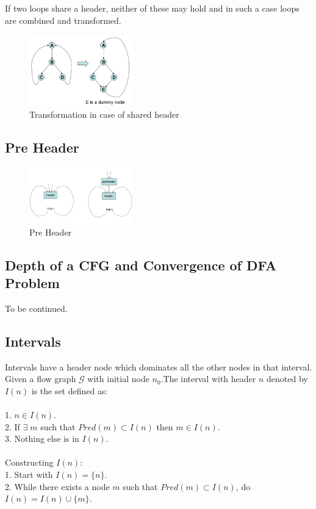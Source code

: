 \documentclass{article}
\begin{document}
If two loops share a header, neither of these may hold and in such a case loops are combined and transformed.

\begin{figure}[h]
    \centering
    \includegraphics[width=0.4\textwidth]{Images/transform.png}
    \caption{Transformation in case of shared header}
    \label{fig:cfg}
\end{figure}

\newpage

\subsection*{Pre Header}
\begin{figure}[h]
    \centering
    \includegraphics[width=0.4\textwidth]{Images/preheader.png}
    \caption{Pre Header}
    \label{fig:cfg}
\end{figure}

\subsection*{Depth of a CFG and Convergence of DFA Problem}
To be continued.

\newpage

\subsection*{Intervals}

Intervals have a header node which dominates all the other nodes in that interval.
Given a flow graph $\mathcal{G}$ with initial node $n_0$.The interval with header $n$ denoted by $I(n)$ is the set defined as: \\ \\
1. $n \in I(n)$. \\
2. If $\exists \; m$ such that $Pred(m) \subset I(n)$ then $m \in I(n)$. \\
3. Nothing else is in $I(n)$. \\ \\
Constructing $I(n)$: \\
1. Start with $I(n) = \{n\}$. \\
2. While there exists a node $m$ such that $Pred(m) \subset I(n)$, do $I(n) = I(n) \cup \{m\}$.
\end{document}
